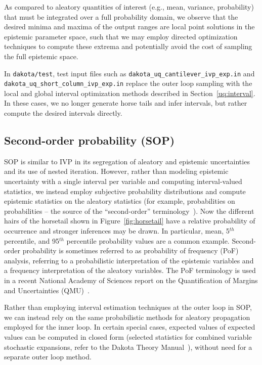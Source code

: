 As compared to aleatory quantities of interest (e.g., mean, variance,
probability) that must be integrated over a full probability domain,
we observe that the desired minima and maxima of the output ranges are
local point solutions in the epistemic parameter space, such that we
may employ directed optimization techniques to compute these extrema
and potentially avoid the cost of sampling the full epistemic space.

In \texttt{dakota/test}, test input files such as
\texttt{dakota\_uq\_cantilever\_ivp\_exp.in} and\\
\texttt{dakota\_uq\_short\_column\_ivp\_exp.in} replace the outer loop
sampling with the local and global interval optimization methods
described in Section~\ref{uq:interval}.  In these cases, we no longer
generate horse tails and infer intervals, but rather compute the
desired intervals directly.


\subsection{Second-order probability (SOP)} \label{adv_models:mixed_uq:sop}

SOP is similar to IVP in its segregation of aleatory and epistemic
uncertainties and its use of nested iteration. However, rather than
modeling epistemic uncertainty with a single interval per variable and
computing interval-valued statistics, we instead employ subjective
probability distributions and compute epistemic statistics on the
aleatory statistics (for example, probabilities on probabilities --
the source of the ``second-order'' terminology~\cite{GoNg99}).  Now
the different hairs of the horsetail shown in
Figure~\ref{fig:horsetail} have a relative probability of occurrence
and stronger inferences may be drawn.  In particular, mean, 5$^{th}$
percentile, and 95$^{th}$ percentile probability values are a common
example. Second-order probability is sometimes referred to as
probability of frequency (PoF) analysis, referring to a probabilistic
interpretation of the epistemic variables and a frequency
interpretation of the aleatory variables.  The PoF terminology is used
in a recent National Academy of Sciences report on the Quantification
of Margins and Uncertainties (QMU)~\cite{NAS08}.

Rather than employing interval estimation techniques at the outer loop
in SOP, we can instead rely on the same probabilistic methods for
aleatory propagation employed for the inner loop.  In certain special
cases, expected values of expected values can be computed in closed
form (selected statistics for combined variable stochastic expansions,
refer to the Dakota Theory Manual~\cite{TheoMan}), without need for a
separate outer loop method.

